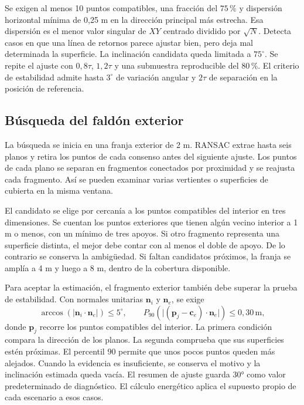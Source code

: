 Se exigen al menos 10 puntos compatibles, una fracción del \(75\,\%\) y dispersión horizontal mínima de 0,25 m en la dirección principal más estrecha. Esa dispersión es el menor valor singular de \(XY\) centrado dividido por \(\sqrt{N}\). Detecta casos en que una línea de retornos parece ajustar bien, pero deja mal determinada la superficie. La inclinación candidata queda limitada a \(75^\circ\). Se repite el ajuste con \(0{,}8\tau\), \(1{,}2\tau\) y una submuestra reproducible del \(80\,\%\). El criterio de estabilidad admite hasta \(3^\circ\) de variación angular y \(2\tau\) de separación en la posición de referencia.

\subsection{Búsqueda del faldón exterior}

La búsqueda se inicia en una franja exterior de 2 m. RANSAC extrae hasta seis planos y retira los puntos de cada consenso antes del siguiente ajuste. Los puntos de cada plano se separan en fragmentos conectados por proximidad y se reajusta cada fragmento. Así se pueden examinar varias vertientes o superficies de cubierta en la misma ventana.

El candidato se elige por cercanía a los puntos compatibles del interior en tres dimensiones. Se cuentan los puntos exteriores que tienen algún vecino interior a 1 m o menos, con un mínimo de tres apoyos. Si otro fragmento representa una superficie distinta, el mejor debe contar con al menos el doble de apoyo. De lo contrario se conserva la ambigüedad. Si faltan candidatos próximos, la franja se amplía a 4 m y luego a 8 m, dentro de la cobertura disponible.

Para aceptar la estimación, el fragmento exterior también debe superar la prueba de estabilidad. Con normales unitarias \(\mathbf n_i\) y \(\mathbf n_e\), se exige
\[
\arccos\!\left(\lvert\mathbf n_i\cdot\mathbf n_e\rvert\right)\leq 5^\circ,
\qquad
P_{90}\!\left(\bigl|(\mathbf p_j-\mathbf c_e)\cdot\mathbf n_e\bigr|\right)
\leq 0{,}30\,\mathrm{m},
\]
donde \(\mathbf p_j\) recorre los puntos compatibles del interior. La primera condición compara la dirección de los planos. La segunda comprueba que sus superficies estén próximas. El percentil 90 permite que unos pocos puntos queden más alejados. Cuando la evidencia es insuficiente, se conserva el motivo y la inclinación estimada queda vacía. El resumen de ajuste guarda 30° como valor predeterminado de diagnóstico. El cálculo energético aplica el supuesto propio de cada escenario a esos casos.

